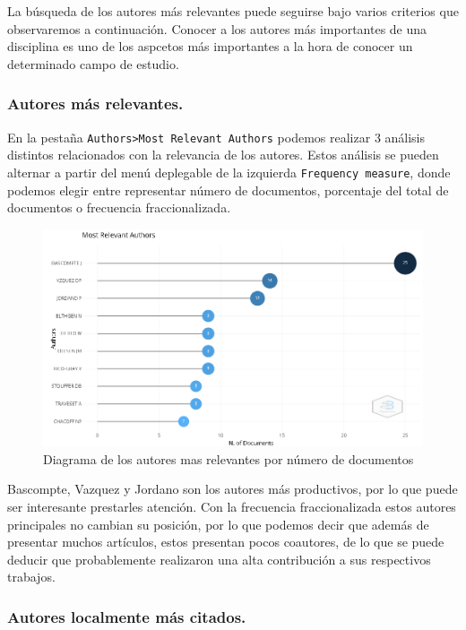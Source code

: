 \documentclass[
]{article}
\begin{document}
La búsqueda de los autores más relevantes puede seguirse bajo varios
criterios que observaremos a continuación. Conocer a los autores más
importantes de una disciplina es uno de los aspcetos más importantes a
la hora de conocer un determinado campo de estudio.

\hypertarget{autores-muxe1s-relevantes.}{%
\subsubsection{Autores más
relevantes.}\label{autores-muxe1s-relevantes.}}

En la pestaña \texttt{Authors\textgreater{}Most\ Relevant\ Authors}
podemos realizar 3 análisis distintos relacionados con la relevancia de
los autores. Estos análisis se pueden alternar a partir del menú
deplegable de la izquierda \texttt{Frequency\ measure}, donde podemos
elegir entre representar número de documentos, porcentaje del total de
documentos o frecuencia fraccionalizada.

\begin{figure}
\centering
\includegraphics{MostRelevantAuthorsND.png}
\caption{Diagrama de los autores mas relevantes por número de
documentos}
\end{figure}

Bascompte, Vazquez y Jordano son los autores más productivos, por lo que
puede ser interesante prestarles atención. Con la frecuencia
fraccionalizada estos autores principales no cambian su posición, por lo
que podemos decir que además de presentar muchos artículos, estos
presentan pocos coautores, de lo que se puede deducir que probablemente
realizaron una alta contribución a sus respectivos trabajos.

\hypertarget{autores-localmente-muxe1s-citados.}{%
\subsubsection{Autores localmente más
citados.}\label{autores-localmente-muxe1s-citados.}}
\end{document}
